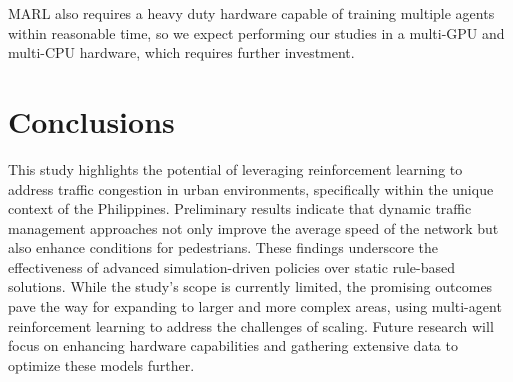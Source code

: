 MARL also requires a heavy duty hardware capable of training multiple agents within reasonable time, so we expect performing our studies in a multi-GPU and multi-CPU hardware, which requires further investment.

\section{Conclusions}
This study highlights the potential of leveraging reinforcement learning to address traffic congestion in urban environments, specifically within the unique context of the Philippines. Preliminary results indicate that dynamic traffic management approaches not only improve the average speed of the network but also enhance conditions for pedestrians. These findings underscore the effectiveness of advanced simulation-driven policies over static rule-based solutions. While the study's scope is currently limited, the promising outcomes pave the way for expanding to larger and more complex areas, using multi-agent reinforcement learning to address the challenges of scaling. Future research will focus on enhancing hardware capabilities and gathering extensive data to optimize these models further.

